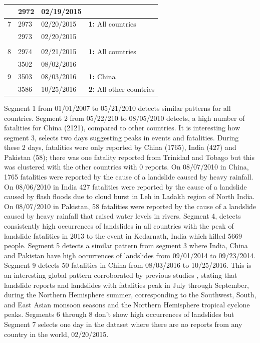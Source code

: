 \begin{table}[!h]
\begin{small}
\begin{tabular}{p{0.35in}p{0.55in}p{0.6in}p{1.2in}}
      & 2972 & 02/19/2015&   \\
     \hline
        7& 2973 & 02/20/2015&{\bfseries 1:} All countries   \\
      & 2973 & 02/20/2015&   \\
      &  & &  \\
     \hline
        8& 2974 & 02/21/2015&{\bfseries 1:} All countries   \\
      & 3502 & 08/02/2016&   \\
     \hline
      9& 3503 & 08/03/2016&{\bfseries 1:} China   \\
      & 3586 & 10/25/2016& {\bfseries 2:} All other countries   \\
     \hline
    \end{tabular}
    \end{small} 
\end{table}

Segment 1 from 01/01/2007 to 05/21/2010 detects similar patterns for all countries. Segment 2 from 05/22/210 to 08/05/2010 detects, a high number of fatalities for China (2121), compared to other countries. It is interesting how segment 3, selects two days suggesting peaks in events and fatalities. During these 2 days, fatalities were only reported by China (1765), India (427) and Pakistan (58); there was one fatality reported from Trinidad and Tobago but this was clustered with the other countries with 0 reports. On 08/07/2010 in China, 1765 fatalities were reported by the cause of a landslide caused by heavy rainfall. On 08/06/2010 in India 427 fatalities were reported by the cause of a landslide caused by flash floods due to cloud burst in Leh in Ladakh region of North India. On 08/07/2010 in Pakistan, 58 fatalities were reported by the cause of a landslide caused by heavy rainfall that raised water levels in rivers. Segment 4, detects consistently high occurrences of landslides in all countries with the peak of landslide fatalities in 2013 to the event in Kedarnath, India which killed 5669 people. Segment 5 detects a similar pattern from segment 3 where India, China and Pakistan have high occurrences of landslides from 09/01/2014 to 09/23/2014. Segment 9 detects 50 fatalities in China from 08/03/2016 to 10/25/2016. This is an interesting global pattern corroborated by previous studies \cite{Kirschbaum:2010}, stating that landslide reports and landslides with fatalities peak in July through September, during the Northern Hemisphere summer, corresponding to the Southwest, South, and East Asian
monsoon seasons and the Northern Hemisphere tropical cyclone peaks. Segments 6 through 8 don't show high occurrences of landslides but Segment 7 selects one day in the dataset where there are no reports from any country in the world, 02/20/2015. 

